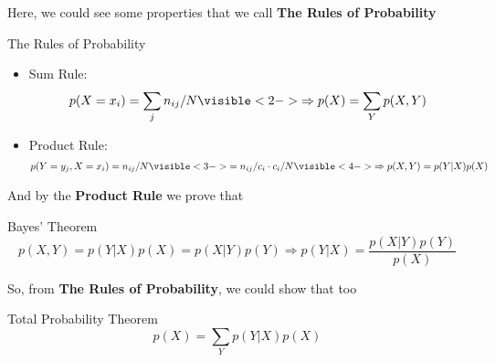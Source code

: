\begin{frame}{\insertsubsection}

Here, we could see some properties that we call \textbf{The Rules of Probability}

\begin{block}{The Rules of Probability}
	\begin{itemize}
		\item Sum Rule: 
		\begin{align} \label{eq:sum-rule}p(X = x_i) =  \sum_j n_{ij} / N
		\visible<2->{ \Rightarrow p(X) = \sum_Y p(X,Y) }
		\end{align}
		\item Product Rule: \begin{align}\label{eq:product-rule}
		p(Y = y_j , X = x_i)=n_{ij}/N \visible<3->{= n_{ij}/c_i \cdot c_i/N}
		\visible<4->{ \Rightarrow p(X,Y) = p(Y|X)p(X) }
\end{align}
\end{itemize}
\end{block}

\end{frame}

\begin{frame}{\insertsubsection}

And by the \textbf{Product Rule} we prove that

\begin{block}{Bayes' Theorem}
\begin{equation}\label{eq:bayes-rule}
	p(X,Y) = p(Y|X)p(X) = p(X|Y)p(Y) \Rightarrow p(Y|X) = \frac{p(X|Y)p(Y)}{p(X)}
\end{equation}
\end{block}

\end{frame}

\begin{frame}{\insertsubsection}

So, from \textbf{The Rules of Probability}, we could show that too 

\begin{block}{Total Probability Theorem}
\begin{equation}\label{eq:total-probability}
	p(X) = \sum_Y p(Y|X)p(X)
\end{equation}
\end{block}




\end{frame}

